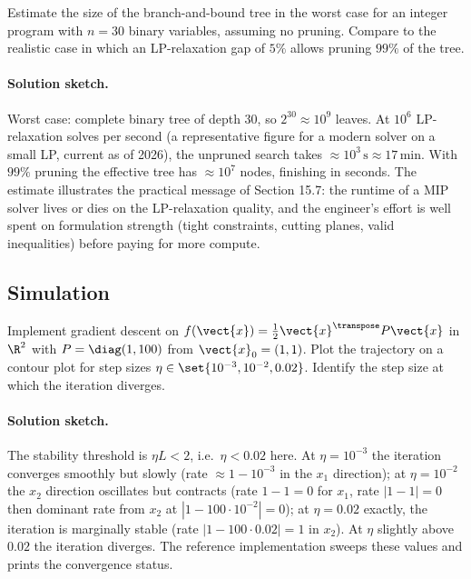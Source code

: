 \begin{exercise}
Estimate the size of the branch-and-bound tree in the worst case
for an integer program with $n = 30$ binary variables, assuming
no pruning. Compare to the realistic case in which an LP-relaxation
gap of $5\%$ allows pruning $99\%$ of the tree.
\end{exercise}

\paragraph{Solution sketch.}
Worst case: complete binary tree of depth $30$, so $2^{30} \approx
10^{9}$ leaves. At $10^{6}$ LP-relaxation solves per second
(a representative figure for a modern solver on a small LP,
current as of 2026), the unpruned search takes $\approx 10^{3}\,
\si{\second} \approx 17\,\si{\minute}$. With $99\%$ pruning the
effective tree has $\approx 10^{7}$ nodes, finishing in seconds. The
estimate illustrates the practical message of Section 15.7: the
runtime of a MIP solver lives or dies on the LP-relaxation
quality, and the engineer's effort is well spent on formulation
strength (tight constraints, cutting planes, valid inequalities)
before paying for more compute.

\subsection*{Simulation}

\begin{exercise}
Implement gradient descent on $f(\vect{x}) = \tfrac{1}{2}
\vect{x}^{\transpose} P \vect{x}$ in $\R^{2}$ with $P =
\diag(1, 100)$ from $\vect{x}_{0} = (1, 1)$. Plot the trajectory
on a contour plot for step sizes $\eta \in \set{10^{-3}, 10^{-2},
0.02}$. Identify the step size at which the iteration diverges.
\end{exercise}

\paragraph{Solution sketch.}
The stability threshold is $\eta L < 2$, i.e.\ $\eta < 0.02$ here.
At $\eta = 10^{-3}$ the iteration converges smoothly but slowly
(rate $\approx 1 - 10^{-3}$ in the $x_{1}$ direction); at $\eta =
10^{-2}$ the $x_{2}$ direction oscillates but contracts (rate $1 -
1 = 0$ for $x_{1}$, rate $|1 - 1| = 0$ then dominant rate from
$x_{2}$ at $|1 - 100 \cdot 10^{-2}| = 0$); at $\eta = 0.02$
exactly, the iteration is marginally stable (rate $|1 - 100 \cdot
0.02| = 1$ in $x_{2}$). At $\eta$ slightly above $0.02$ the
iteration diverges. The reference implementation
sweeps these values and prints the convergence status.

